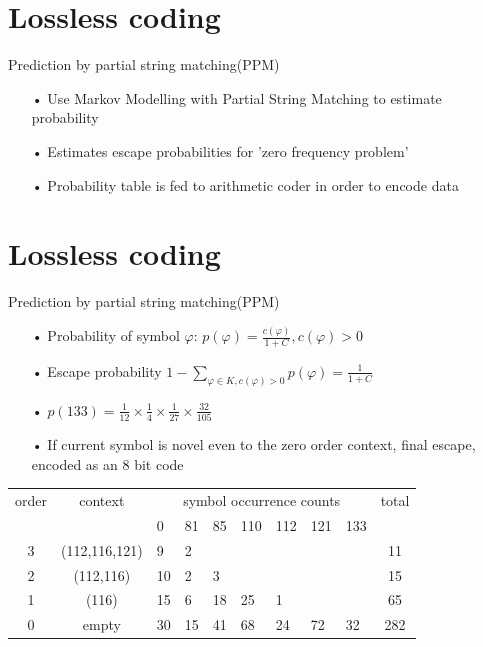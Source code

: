 \documentclass[notes=hide]{beamer}
\begin{document}
\section{Lossless coding}
\begin{frame}


   \begin{block}{Prediction by partial string matching(PPM)}
   	\begin{itemize}
   		\item [•] Use Markov Modelling with Partial String Matching to estimate probability
   		\item [•] Estimates escape probabilities for 'zero frequency problem'
        \item [•] Probability table is fed to arithmetic coder in order to encode data
   	\end{itemize}
   \end{block}    

\end{frame}


\newpage
\section{Lossless coding}
\begin{frame}


   \begin{block}{Prediction by partial string matching(PPM)}
   	\begin{itemize}
   		\item [•] Probability of symbol $\varphi$: $p(\varphi)=\frac{c(\varphi)}{1+C}, c(\varphi)>0$
        \item [•] Escape probability $1-\sum\limits_{\varphi\in K,c(\varphi)>0}p(\varphi)=\frac{1}{1+C}$ 
        \item [•] $p(133)=\frac{1}{12}\times\frac{1}{4}\times\frac{1}{27}\times\frac{32}{105}$
        \item [•] If current symbol is novel even to the zero order context, final escape, encoded as an 8 bit code
   	\end{itemize}
   \end{block}    
\begin{tabular}{|c|c|l l l l l l l|c|}
  \hline
  order & context & \multicolumn{7}{c|}{symbol occurrence counts} & total \\ 
  &					& 0 & 81 & 85 & 110	&112 & 121 & 133 & \\	 	
  \hline \hline
  3 & (112,116,121) & 9 & 2  & & & & & & 11 \\
  \hline
  2 & (112,116)		& 10& 2  & 3 & & & & & 15 \\
  \hline
  1 & (116)			& 15& 6  & 18 & 25 & 1 & & & 65 \\
  \hline
  0 & empty 		& 30& 15 & 41 & 68 & 24 & 72 & 32 &282\\
  \hline 
\end{tabular} 
\end{frame}
\end{document}
